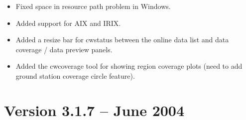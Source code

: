 \begin{itemize}

  \item Fixed space in resource path problem in Windows.

  \item Added support for AIX and IRIX.

  \item Added a resize bar for cwstatus between the online data list
  and data coverage / data preview panels.

  \item Added the cwcoverage tool for showing region coverage plots
  (need to add ground station coverage circle feature).

\end{itemize}


\section{Version 3.1.7 -- June 2004}

